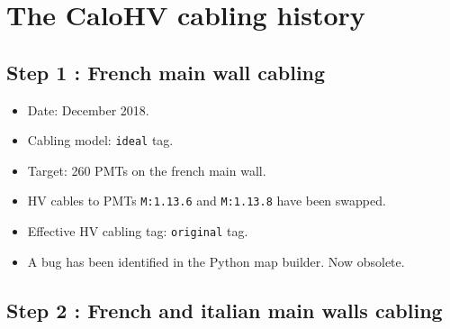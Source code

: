 
\clearpage
\section{The CaloHV cabling history}


\subsection{Step 1 : French main wall cabling}

\begin{itemize}
\item Date: December 2018.
\item Cabling model: \texttt{ideal} tag.
\item Target: 260 PMTs on the french main wall.
\item HV cables to PMTs \verb+M:1.13.6+ and \verb+M:1.13.8+ have been swapped.
\item Effective HV cabling tag: \texttt{original} tag.
\item A bug has been identified in the Python map builder. Now obsolete.
\end{itemize}

\subsection{Step 2 : French and italian main walls cabling}

